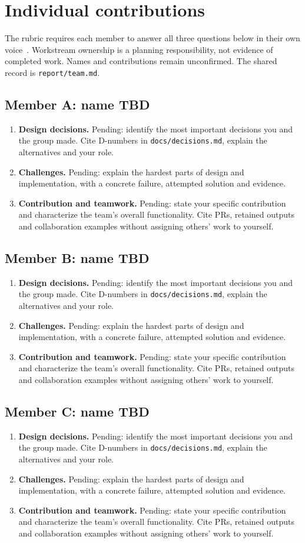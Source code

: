 \section{Individual contributions}
The rubric requires each member to answer all three questions below in their
own voice~\cite{rubric}. Workstream ownership is a planning responsibility,
not evidence of completed work. Names and contributions remain unconfirmed.
The shared record is \texttt{report/team.md}.

\newcommand{\reflection}[1]{
\subsection{#1: name TBD}
\begin{enumerate}
\item \textbf{Design decisions.} Pending: identify the most important decisions
you and the group made. Cite D-numbers in \texttt{docs/decisions.md}, explain
the alternatives and your role.
\item \textbf{Challenges.} Pending: explain the hardest parts of design and
implementation, with a concrete failure, attempted solution and evidence.
\item \textbf{Contribution and teamwork.} Pending: state your specific
contribution and characterize the team's overall functionality. Cite PRs,
retained outputs and collaboration examples without assigning others' work
to yourself.
\end{enumerate}}
\reflection{Member A}
\reflection{Member B}
\reflection{Member C}
